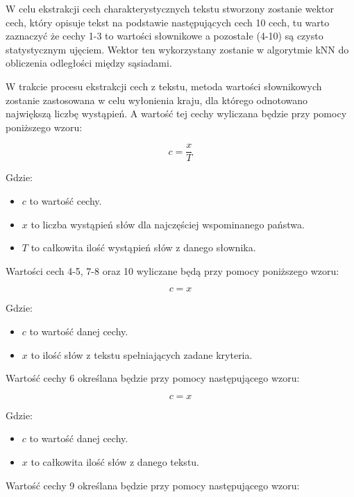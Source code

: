 \documentclass{article}
\begin{document}
\noindent W celu ekstrakcji cech charakterystycznych tekstu stworzony zostanie wektor cech, który opisuje tekst na podstawie następujących cech 10 cech, tu warto zaznaczyć że cechy 1-3 to wartości słownikowe a pozostałe (4-10) są czysto statystycznym ujęciem. Wektor ten wykorzystany zostanie w algorytmie kNN do obliczenia odległości między sąsiadami. \newline

\noindent W trakcie procesu ekstrakcji cech z tekstu, metoda wartości słownikowych zostanie zastosowana w celu wyłonienia kraju, dla którego odnotowano największą liczbę wystąpień. A wartość tej cechy wyliczana będzie przy pomocy poniższego wzoru:

\begin{equation}
    c = \frac{x}{T}
\end{equation}

Gdzie:
\begin{itemize}
    \item $c$ to wartość cechy.
    \item $x$ to liczba wystąpień słów dla najczęściej wspominanego państwa.
    \item $T$ to całkowita ilość wystąpień słów z danego słownika.
\end{itemize}

Wartości cech 4-5, 7-8 oraz 10 wyliczane będą przy pomocy poniższego wzoru:

\begin{equation}
    c = x
\end{equation}

Gdzie:
\begin{itemize}
    \item $c$ to wartość danej cechy.
    \item $x$ to ilość słów z tekstu spełniających zadane kryteria.
\end{itemize}

Wartość cechy 6 określana będzie przy pomocy następującego wzoru:

\begin{equation}
    c = x
\end{equation}

Gdzie: 
\begin{itemize}
    \item $c$ to wartość danej cechy.
    \item $x$ to całkowita ilość słów z danego tekstu.
\end{itemize}

Wartość cechy 9 określana będzie przy pomocy następującego wzoru:
\end{document}
